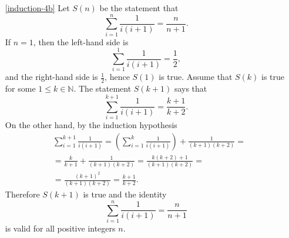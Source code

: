 \begin{enumerate}
\item[\ref{induction-4b}] Let $S(n)$ be the statement that 
$$
\sum_{i=1}^n\frac{1}{i(i+1)}=\frac{n}{n+1}.
$$
If $n=1$, then the left-hand side is
$$
\sum_{i=1}^1\frac{1}{i(i+1)}=\frac{1}{2}, 
$$
and the right-hand side is $\frac{1}{2}$, hence $S(1)$ is true. Assume that $S(k)$ is true for some $1\leq k\in\mathbb{N}$.
The statement $S(k+1)$ says that
$$
\sum_{i=1}^{k+1}\frac{1}{i(i+1)}=\frac{k+1}{k+2}.
$$
On the other hand, by the induction hypothesis
\begin{align*}
& \sum_{i=1}^{k+1}\frac{1}{i(i+1)}=\left(\sum_{i=1}^{k}\frac{1}{i(i+1)}\right)+\frac{1}{(k+1)(k+2)}=\\
& =\frac{k}{k+1}+\frac{1}{(k+1)(k+2)}=\frac{k(k+2)+1}{(k+1)(k+2)}=\\
& =\frac{(k+1)^2}{(k+1)(k+2)}=\frac{k+1}{k+2}.
\end{align*}
Therefore $S(k+1)$ is true and the identity
$$
\sum_{i=1}^n\frac{1}{i(i+1)}=\frac{n}{n+1}
$$
is valid for all positive integers $n$.



\end{enumerate}
